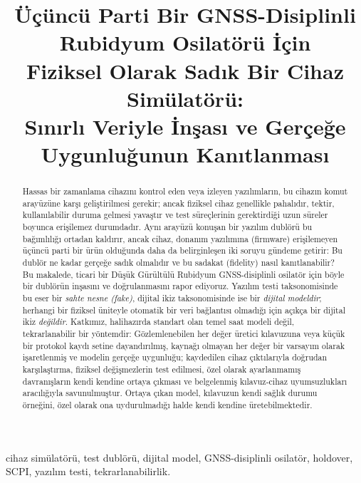 \documentclass[conference]{IEEEtran}
\begin{document}
\title{Üçüncü Parti Bir GNSS-Disiplinli Rubidyum Osilatörü İçin\\ Fiziksel Olarak Sadık Bir Cihaz Simülatörü:\\ Sınırlı Veriyle İnşası ve Gerçeğe Uygunluğunun Kanıtlanması}

\author{
}

\maketitle

\begin{abstract}
Hassas bir zamanlama cihazını kontrol eden veya izleyen yazılımların, bu cihazın komut arayüzüne karşı geliştirilmesi gerekir; ancak fiziksel cihaz genellikle pahalıdır, tektir, kullanılabilir duruma gelmesi yavaştır ve test süreçlerinin gerektirdiği uzun süreler boyunca erişilemez durumdadır. Aynı arayüzü konuşan bir yazılım dublörü bu bağımlılığı ortadan kaldırır, ancak cihaz, donanım yazılımına (firmware) erişilemeyen üçüncü parti bir ürün olduğunda daha da belirginleşen iki soruyu gündeme getirir: Bu dublör ne kadar gerçeğe sadık olmalıdır ve bu sadakat (fidelity) nasıl kanıtlanabilir? Bu makalede, ticari bir Düşük Gürültülü Rubidyum GNSS-disiplinli osilatör için böyle bir dublörün inşasını ve doğrulanmasını rapor ediyoruz. Yazılım testi taksonomisinde bu eser bir \emph{sahte nesne (fake)}, dijital ikiz taksonomisinde ise bir \emph{dijital modeldir}; herhangi bir fiziksel üniteyle otomatik bir veri bağlantısı olmadığı için açıkça bir dijital ikiz \emph{değildir}. Katkımız, halihazırda standart olan temel saat modeli değil, tekrarlanabilir bir yöntemdir: Gözlemlenebilen her değer üretici kılavuzuna veya küçük bir protokol kaydı setine dayandırılmış, kaynağı olmayan her değer bir varsayım olarak işaretlenmiş ve modelin gerçeğe uygunluğu; kaydedilen cihaz çıktılarıyla doğrudan karşılaştırma, fiziksel değişmezlerin test edilmesi, özel olarak ayarlanmamış davranışların kendi kendine ortaya çıkması ve belgelenmiş kılavuz-cihaz uyumsuzlukları aracılığıyla savunulmuştur. Ortaya çıkan model, kılavuzun kendi sağlık durumu örneğini, özel olarak ona uydurulmadığı halde kendi kendine üretebilmektedir.
\end{abstract}

\begin{IEEEkeywords}
cihaz simülatörü, test dublörü, dijital model, GNSS-disiplinli osilatör, holdover, SCPI, yazılım testi, tekrarlanabilirlik.
\end{IEEEkeywords}
\end{document}
